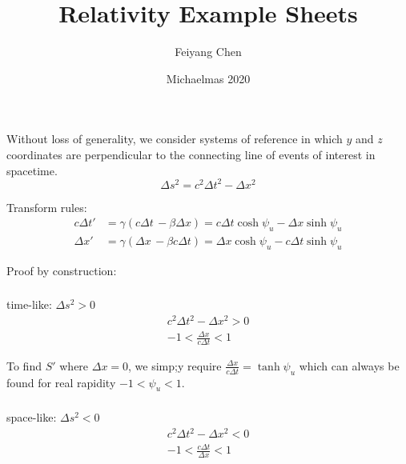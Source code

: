 \documentclass[12pt]{article}
\begin{document}
\title{Relativity Example Sheets}
\author{Feiyang Chen}
\date{Michaelmas 2020}
\maketitle
\thispagestyle{empty}
\tableofcontents
\newpage
\section{}
\subsection{} Without loss of generality, we consider systems of reference in which $y$ and $z$ coordinates are perpendicular to the connecting line of events of interest in spacetime.
        \begin{equation*}
            \Delta s^2 = c^2 \Delta t^2 - \Delta x^2
        \end{equation*}

        Transform rules:
        \begin{align*}
            c\Delta t' &= \gamma (c\Delta t\, - \beta \Delta x) = c\Delta t \cosh \psi_u - \Delta x \sinh \psi_u\\
            \Delta x' &= \gamma (\Delta x\, - \beta c \Delta t) = \Delta x \cosh \psi_u - c\Delta t \sinh \psi_u
        \end{align*}
        
        Proof by construction:
            \subsubsection{} time-like: \(\Delta s^2 > 0\)
            \begin{gather*}
                c^2 \Delta t^2 - \Delta x^2 > 0\\
                - 1 < \frac{\Delta x}{c\Delta t} < 1 
            \end{gather*}
                
            To find $S'$ where $\Delta x=0$, we simp;y require $\frac{\Delta x}{c\Delta t}=\tanh \psi_u$ which can always be found for real rapidity $-1<\psi_u<1$.
            \subsubsection{} space-like: \(\Delta s^2 < 0\)
            \begin{gather*}
                c^2 \Delta t^2 - \Delta x^2 < 0\\
                - 1 < \frac{c\Delta t}{\Delta x} < 1 
            \end{gather*}
                
\end{document}

